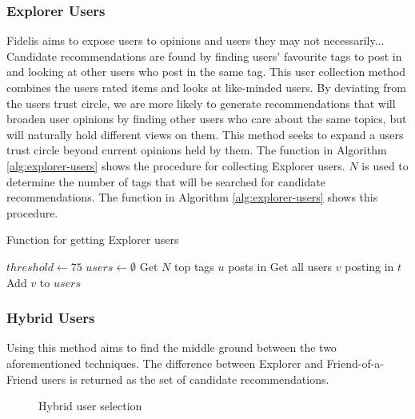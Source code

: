 \subsubsection{Explorer Users}
Fidelis aims to expose users to opinions and users they may not necessarily... 
Candidate recommendations are found by finding users' favourite tags to post in and looking at other users who post in the same tag. This user collection method combines the users rated items and looks at like-minded users. By deviating from the users trust circle, we are more likely to generate recommendations that will broaden user opinions by finding other users who care about the same topics, but will naturally hold different views on them. This method seeks to expand a users trust circle beyond current opinions held by them. The function in Algorithm \ref{alg:explorer-users} shows the procedure for collecting Explorer users. $N$ is used to determine the number of tags that will be searched for candidate recommendations. The function in Algorithm \ref{alg:explorer-users} shows this procedure.

\begin{algorithm}
\caption{Function for getting Explorer users}
\label{alg:explorer-users}
\begin{algorithmic}[1]
	\State $threshold\gets 75$
	\State $users\gets \emptyset$
	\State Get $N$ top tags $u$ posts in
		\State Get all users $v$ posting in $t$
			\State Add $v$ to $users$
		\EndIf
	\EndFor
	\State {}
\EndFunction
\end{algorithmic}
\end{algorithm}

\subsubsection{Hybrid Users}
Using this method aims to find the middle ground between the two aforementioned techniques. The difference between Explorer and Friend-of-a-Friend users is returned as the set of candidate recommendations. 

\begin{figure}
\centering
{}
\caption{Hybrid user selection}
\label{fig:hybrid}
\end{figure}


